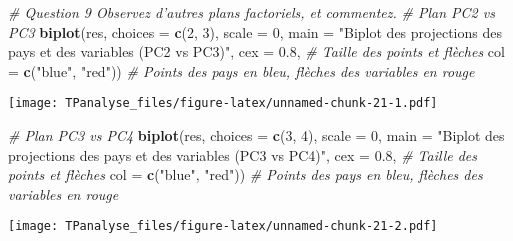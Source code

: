 \documentclass[
]{article}
\newenvironment{Shaded}{\begin{snugshade}}{\end{snugshade}}
\newcommand{\AttributeTok}[1]{\textcolor[rgb]{0.13,0.29,0.53}{#1}}
\newcommand{\CommentTok}[1]{\textcolor[rgb]{0.56,0.35,0.01}{\textit{#1}}}
\newcommand{\DecValTok}[1]{\textcolor[rgb]{0.00,0.00,0.81}{#1}}
\newcommand{\FloatTok}[1]{\textcolor[rgb]{0.00,0.00,0.81}{#1}}
\newcommand{\FunctionTok}[1]{\textcolor[rgb]{0.13,0.29,0.53}{\textbf{#1}}}
\newcommand{\NormalTok}[1]{#1}
\newcommand{\OtherTok}[1]{\textcolor[rgb]{0.56,0.35,0.01}{#1}}
\newcommand{\SpecialCharTok}[1]{\textcolor[rgb]{0.81,0.36,0.00}{\textbf{#1}}}
\newcommand{\StringTok}[1]{\textcolor[rgb]{0.31,0.60,0.02}{#1}}
\begin{document}
\begin{Shaded}
\begin{Highlighting}[]
\CommentTok{\# Question 9 Observez d’autres plans factoriels, et commentez.}
\CommentTok{\# Plan PC2 vs PC3}
\FunctionTok{biplot}\NormalTok{(res, }\AttributeTok{choices =} \FunctionTok{c}\NormalTok{(}\DecValTok{2}\NormalTok{, }\DecValTok{3}\NormalTok{), }\AttributeTok{scale =} \DecValTok{0}\NormalTok{, }
       \AttributeTok{main =} \StringTok{"Biplot des projections des pays et des variables (PC2 vs PC3)"}\NormalTok{,}
       \AttributeTok{cex =} \FloatTok{0.8}\NormalTok{,  }\CommentTok{\# Taille des points et flèches}
       \AttributeTok{col =} \FunctionTok{c}\NormalTok{(}\StringTok{"blue"}\NormalTok{, }\StringTok{"red"}\NormalTok{))  }\CommentTok{\# Points des pays en bleu, flèches des variables en rouge}
\end{Highlighting}
\end{Shaded}

\texttt{[image: TPanalyse\_files/figure-latex/unnamed-chunk-21-1.pdf]}

\begin{Shaded}
\begin{Highlighting}[]
\CommentTok{\# Plan PC3 vs PC4}
\FunctionTok{biplot}\NormalTok{(res, }\AttributeTok{choices =} \FunctionTok{c}\NormalTok{(}\DecValTok{3}\NormalTok{, }\DecValTok{4}\NormalTok{), }\AttributeTok{scale =} \DecValTok{0}\NormalTok{, }
       \AttributeTok{main =} \StringTok{"Biplot des projections des pays et des variables (PC3 vs PC4)"}\NormalTok{,}
       \AttributeTok{cex =} \FloatTok{0.8}\NormalTok{,  }\CommentTok{\# Taille des points et flèches}
       \AttributeTok{col =} \FunctionTok{c}\NormalTok{(}\StringTok{"blue"}\NormalTok{, }\StringTok{"red"}\NormalTok{))  }\CommentTok{\# Points des pays en bleu, flèches des variables en rouge}
\end{Highlighting}
\end{Shaded}

\texttt{[image: TPanalyse\_files/figure-latex/unnamed-chunk-21-2.pdf]}

\begin{Shaded}
\end{Shaded}
\end{document}
